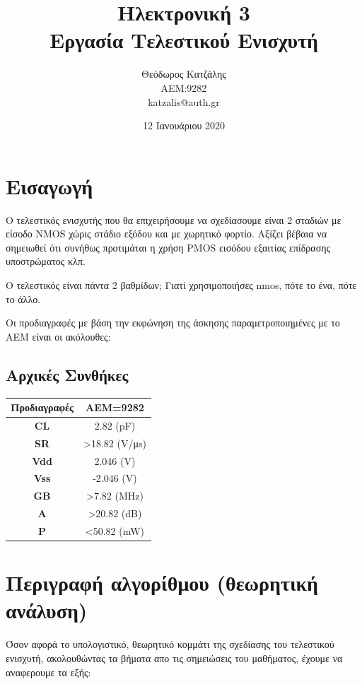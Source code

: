 \documentclass[12pt, a4paper]{article}
\title{\textbf{Ηλεκτρονική 3} \\ \textbf{Εργασία Τελεστικού Ενισχυτή}}
\author{Θεόδωρος Κατζάλης \\ ΑΕΜ:9282 \\ katzalis@auth.gr}
\date{12 Ιανουάριου 2020}
\begin{document}
\maketitle
\sloppy
\tableofcontents
\pagebreak

\section{Εισαγωγή}

Ο τελεστικός ενισχυτής που θα επιχειρήσουμε να σχεδίασουμε είναι 2 σταδιών με είσοδο ΝMOS χώρις στάδιο εξόδου και με χωρητικό φορτίο. Αξίζει βέβαια να σημειωθεί ότι συνήθως προτιμάται η χρήση PMOS εισόδου εξαιτίας επίδρασης υποστρώματος κλπ.

Ο τελεστικός είναι πάντα 2 βαθμίδων; Γιατί χρησιμοποιήσες nmos, πότε το ένα, πότε το άλλο.

Οι προδιαγραφές με βάση την εκφώνηση της άσκησης παραμετροποιημένες με το ΑΕΜ είναι οι ακόλουθες:
\subsection{Αρχικές Συνθήκες}


\begin{table}[h!]
\centering
\begin{tabular}{|c|c|}
	\hline
	Προδιαγραφές & AEM=9282  \\
	\hline
	\textbf{CL} & 2.82 (pF) \\
	\hline
	\textbf{SR} &  >18.82 (V/μs)\\
	\hline
	\textbf{Vdd} & 2.046 (V) \\
	\hline
	\textbf{Vss} & -2.046 (V)\\
	\hline
	\textbf{GB} & >7.82 (MHz)\\
    \hline
    \textbf{A} & >20.82 (dB)\\
    \hline
    \textbf{P} & <50.82 (mW)\\
    \hline
\end{tabular}
\end{table}

\section{Περιγραφή αλγορίθμου (θεωρητική ανάλυση)}

Όσον αφορά το υπολογιστικό, θεωρητικό κομμάτι της σχεδίασης του τελεστικού ενισχυτή, ακολουθώντας τα βήματα απο τις σημειώσεις του μαθήματος, έχουμε να αναφερουμε τα εξής:
\end{document}

